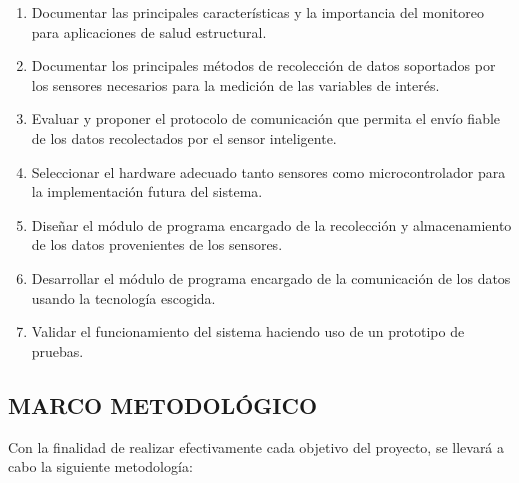 \documentclass[12pt,letterpaper]{article}
\begin{document}
\begin{enumerate}[1.]


	\item Documentar las principales características y la importancia del monitoreo para aplicaciones de salud estructural.

	\item Documentar los principales métodos de recolección de datos soportados por los sensores necesarios para la medición de las variables de interés.

	\item Evaluar y proponer el protocolo de comunicación que permita el envío fiable de los datos recolectados por el sensor inteligente.

	\item Seleccionar el hardware adecuado tanto sensores como microcontrolador para la implementación futura del sistema.

	\item Diseñar el módulo de programa encargado de la recolección y almacenamiento de los datos provenientes de los sensores.

	\item Desarrollar el módulo de programa encargado de la comunicación de los datos usando la tecnología escogida.

	\item Validar el funcionamiento del sistema haciendo uso de un prototipo de pruebas.

\end{enumerate}
\newpage



\begin{center}

	\section*{ MARCO METODOLÓGICO}

\end{center}

\vspace{1cm}

Con la finalidad de realizar efectivamente cada objetivo del proyecto, se llevará a cabo la siguiente metodología:
\bigskip
\end{document}
